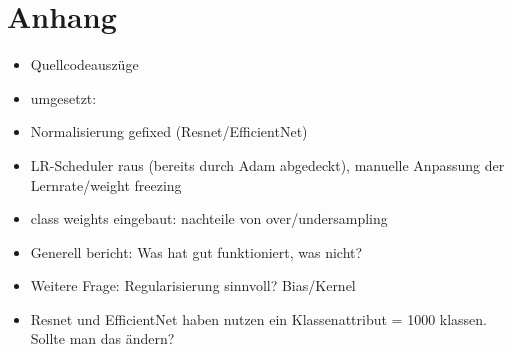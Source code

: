 \documentclass{article}
\begin{document}
    
    

    \section*{Anhang}
    \begin{itemize}
        \item Quellcodeauszüge
        \item umgesetzt:
        \item Normalisierung gefixed (Resnet/EfficientNet)
        \item LR-Scheduler raus (bereits durch Adam abgedeckt), manuelle Anpassung der Lernrate/weight freezing
        \item class weights eingebaut: nachteile von over/undersampling
        \item Generell bericht: Was hat gut funktioniert, was nicht?
    \end{itemize}
    \begin{itemize}
        \item Weitere Frage: Regularisierung sinnvoll? Bias/Kernel
        \item Resnet und EfficientNet haben nutzen ein Klassenattribut = 1000 klassen. Sollte man das ändern?
    \end{itemize}
\end{document}
